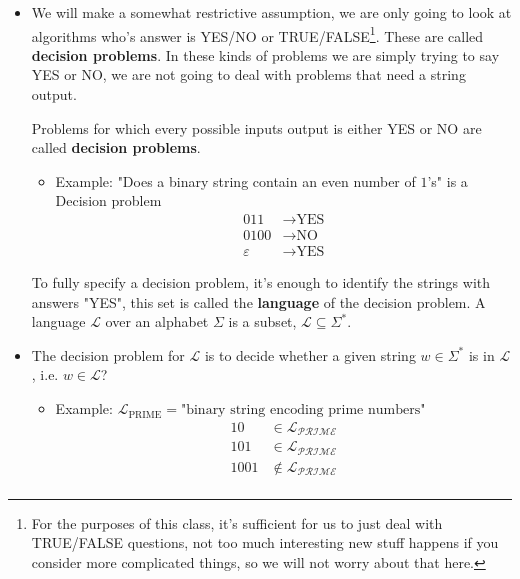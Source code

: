 \documentclass[11pt]{article}
\begin{document}
\begin{itemize}
    \item We will make a somewhat restrictive assumption, we are only going to look at algorithms who's answer is YES/NO or TRUE/FALSE\footnote{For the purposes of this class, it's sufficient for us to just deal with TRUE/FALSE questions, not too much interesting new stuff happens if you consider more complicated things, so we will not worry about that here.}. These are called \textbf{decision problems}. In these kinds of problems we are simply trying to say YES or NO, we are not going to deal with problems that need a string output. 
    \begin{tcolorbox} [title= Definition:, colback=black!10!white]
        Problems for which every possible inputs output is either YES or NO are called \textbf{decision problems}.
    \end{tcolorbox}
    \begin{itemize}
        \item[$ $] Example: "Does a binary string contain an even number of $1$'s" is a Decision problem
        \begin{align*}
            011 &\rightarrow \text{YES}\\ 
            0100 &\rightarrow \text{NO}\\
            \varepsilon &\rightarrow \text{YES}
        \end{align*}  
    \end{itemize}
    \begin{tcolorbox} [title= Definition:, colback=black!10!white]
        To fully specify a decision problem, it's enough to identify the strings with answers "YES", this set is called the \textbf{language}\footnotemark{} of the decision problem. A language $\mathcal{L}$ over an alphabet $\Sigma$ is a subset, $\mathcal{L}\subseteq\Sigma^*$.
    \end{tcolorbox}
    \item The decision problem for $\mathcal{L}$ is to decide whether a given string $w\in\Sigma^*$ is in $\mathcal{L}$, i.e. $w\in\mathcal{L}$?
    \begin{itemize}
        \item [$ $] Example: $\mathcal{L}_{\text{PRIME}}=\text{"binary string encoding prime numbers"}$
        \begin{align*}
            10 &\in\mathcal{L_\text{PRIME}}\\
            101 &\in\mathcal{L_\text{PRIME}}\\
            1001 &\notin\mathcal{L_\text{PRIME}}\\
        \end{align*}
    \end{itemize}
\end{itemize}
\end{document}
